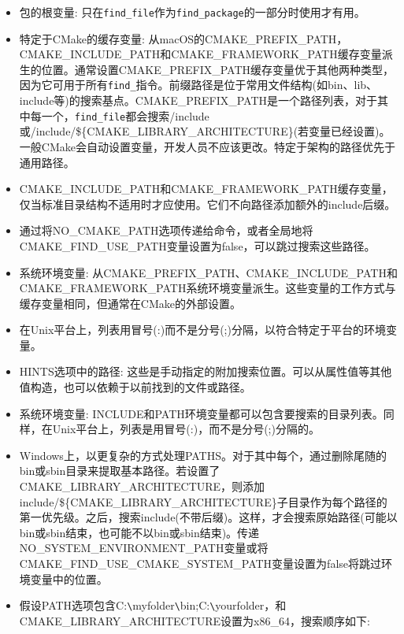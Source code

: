 \begin{itemize}
\item 
包的根变量: 只在\texttt{find\_file}作为\texttt{find\_package}的一部分时使用才有用。

\item 
特定于CMake的缓存变量: 从macOS的CMAKE\_PREFIX\_PATH，CMAKE\_INCLUDE\_PATH和CMAKE\_FRAMEWORK\_PATH缓存变量派生的位置。通常设置CMAKE\_PREFIX\_PATH缓存变量优于其他两种类型，因为它可用于所有\texttt{find\_}指令。前缀路径是位于常用文件结构(如bin、lib、include等)的搜索基点。CMAKE\_PREFIX\_PATH是一个路径列表，对于其中每一个，\texttt{find\_file}都会搜索/include或/include/\$\{CMAKE\_LIBRARY\_ARCHITECTURE\}(若变量已经设置)。一般CMake会自动设置变量，开发人员不应该更改。特定于架构的路径优先于通用路径。

\item 
CMAKE\_INCLUDE\_PATH和CMAKE\_FRAMEWORK\_PATH缓存变量，仅当标准目录结构不适用时才应使用。它们不向路径添加额外的include后缀。

\item 
通过将NO\_CMAKE\_PATH选项传递给命令，或者全局地将CMAKE\_FIND\_USE\_PATH变量设置为false，可以跳过搜索这些路径。

\item 
系统环境变量: 从CMAKE\_PREFIX\_PATH、CMAKE\_INCLUDE\_PATH和CMAKE\_FRAMEWORK\_PATH系统环境变量派生。这些变量的工作方式与缓存变量相同，但通常在CMake的外部设置。

\item 
在Unix平台上，列表用冒号(:)而不是分号(;)分隔，以符合特定于平台的环境变量。

\item 
HINTS选项中的路径: 这些是手动指定的附加搜索位置。可以从属性值等其他值构造，也可以依赖于以前找到的文件或路径。

\item 
系统环境变量: INCLUDE和PATH环境变量都可以包含要搜索的目录列表。同样，在Unix平台上，列表是用冒号(:)，而不是分号(;)分隔的。

\item 
Windows上，以更复杂的方式处理PATHS。对于其中每个，通过删除尾随的bin或sbin目录来提取基本路径。若设置了CMAKE\_LIBRARY\_ARCHITECTURE，则添加include/\$\{CMAKE\_LIBRARY\_ARCHITECTURE\}子目录作为每个路径的第一优先级。之后，搜索include(不带后缀)。这样，才会搜索原始路径(可能以bin或sbin结束，也可能不以bin或sbin结束)。传递NO\_SYSTEM\_ENVIRONMENT\_PATH变量或将CMAKE\_FIND\_USE\_CMAKE\_SYSTEM\_PATH变量设置为false将跳过环境变量中的位置。

\item 
假设PATH选项包含C:\verb|\|myfolder\verb|\|bin;C:\verb|\|yourfolder，和CMAKE\_LIBRARY\_ARCHITECTURE设置为x86\_64，搜索顺序如下:


\end{itemize}
